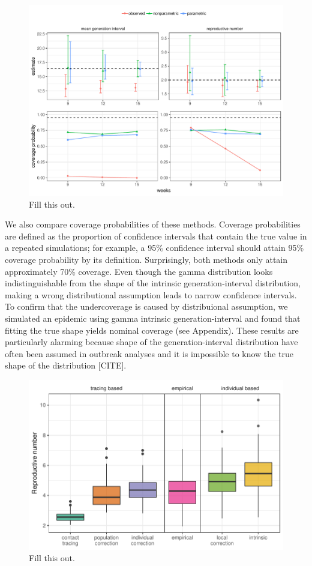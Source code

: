 \documentclass[12pt]{article}
\begin{document}
\begin{figure}
\includegraphics[width=\textwidth]{../fig/compare_methods.pdf}
\caption{Fill this out.}
\label{fig:test}
\end{figure}

We also compare coverage probabilities of these methods. 
Coverage probabilities are defined as the proportion of confidence intervals that contain the true value in a repeated simulations; for example, a 95\% confidence interval should attain 95\% coverage probability by its definition.
Surprisingly, both methods only attain approximately 70\% coverage.
Even though the gamma distribution looks indistinguishable from the shape of the intrinsic generation-interval distribution, making a wrong distributional assumption leads to narrow confidence intervals.
To confirm that the undercoverage is caused by distribuional assumption, we simulated an epidemic using gamma intrinsic generation-interval and found that fitting the true shape yields nominal coverage (see Appendix).
These results are particularly alarming because shape of the generation-interval distribution have often been assumed in outbreak analyses and it is impossible to know the true shape of the distribution [CITE].

\begin{figure}
\includegraphics[width=\textwidth]{../fig/cmp_reproductive.pdf}
\caption{Fill this out.}
\label{fig:cmp}
\end{figure}
\end{document}
